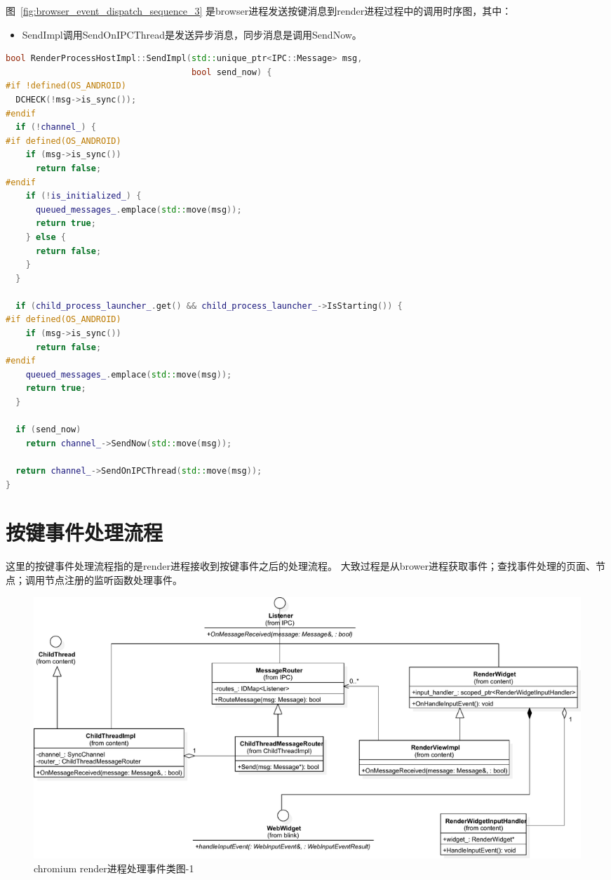 图~\ref{fig:browser_event_dispatch_sequence_3}
是browser进程发送按键消息到render进程过程中的调用时序图，其中：

\begin{itemize}
  \item SendImpl调用SendOnIPCThread是发送异步消息，同步消息是调用SendNow。
\end{itemize}

\begin{spacing}{1.0}
\begin{lstlisting}[language={C++}]
bool RenderProcessHostImpl::SendImpl(std::unique_ptr<IPC::Message> msg,
                                     bool send_now) {
#if !defined(OS_ANDROID)
  DCHECK(!msg->is_sync());
#endif
  if (!channel_) {
#if defined(OS_ANDROID)
    if (msg->is_sync())
      return false;
#endif
    if (!is_initialized_) {
      queued_messages_.emplace(std::move(msg));
      return true;
    } else {
      return false;
    }
  }

  if (child_process_launcher_.get() && child_process_launcher_->IsStarting()) {
#if defined(OS_ANDROID)
    if (msg->is_sync())
      return false;
#endif
    queued_messages_.emplace(std::move(msg));
    return true;
  }

  if (send_now)
    return channel_->SendNow(std::move(msg));

  return channel_->SendOnIPCThread(std::move(msg));
}
\end{lstlisting}
\end{spacing}


\section{按键事件处理流程}
这里的按键事件处理流程指的是render进程接收到按键事件之后的处理流程。
大致过程是从brower进程获取事件；查找事件处理的页面、节点；调用节点注册的监听函数处理事件。


\begin{figure}[H] 
  \centering 
  \includegraphics[width=\textwidth]{image/event_study/render_event_dispatch_class.pdf} 
  \caption{chromium render进程处理事件类图-1} \label{fig:render_event_dispatch_class} 
\end{figure}

